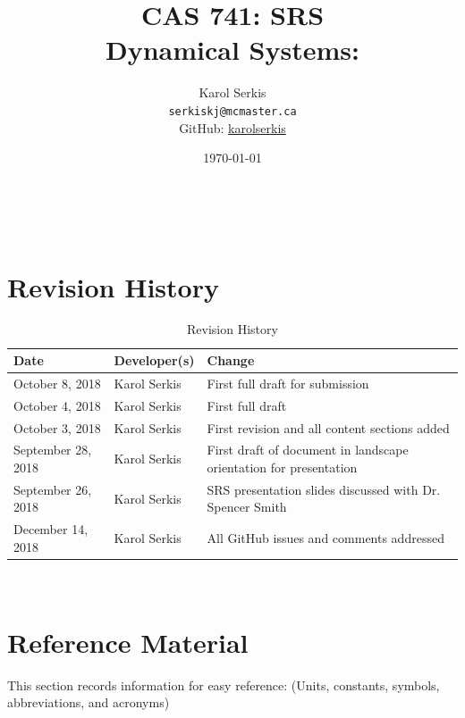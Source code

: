 \documentclass[12pt]{article}
\begin{document}

\title{CAS 741: SRS\\[10pt]\Large Dynamical Systems: \progname}
\author{Karol Serkis\\\texttt{serkiskj@mcmaster.ca}\\GitHub:
\href{https://www.github.com/karolserkis}{karolserkis}}
\date{\today}
	
\maketitle

~\newpage

\tableofcontents

\clearpage

\setcounter{secnumdepth}{0}

\section{Revision History}

\begin{table}[hp]
\caption{Revision History}
\begin{tabularx}{\textwidth}{llX}
\toprule
\textbf{Date} & \textbf{Developer(s)} & \textbf{Change}\\
\midrule
October 8, 2018 & Karol Serkis &  First full draft for submission\\
October 4, 2018 & Karol Serkis &  First full draft\\
October 3, 2018 & Karol Serkis & First revision and all content sections added
\\September 28, 2018 & 
Karol Serkis & First draft of document in landscape
orientation for presentation\\
September 26, 2018 & Karol Serkis & SRS presentation slides discussed with Dr.
Spencer Smith \\
December 14, 2018 & Karol Serkis & All GitHub issues and comments addressed \\
\bottomrule
\end{tabularx}
\end{table}

~\newpage

\section{Reference Material}

This section records information for easy reference: (Units, constants, 
symbols, abbreviations, and acronyms)
\end{document}
